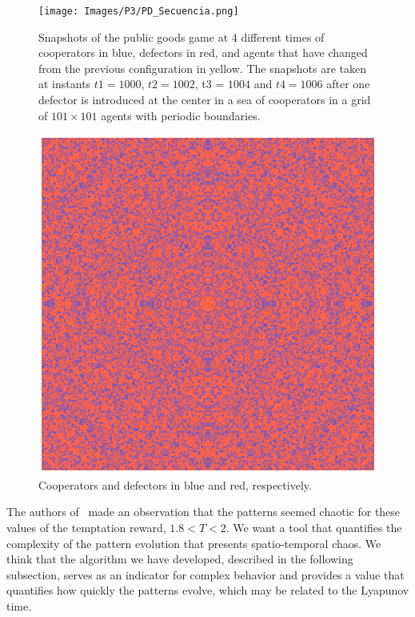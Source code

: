 \begin{figure}
    \centering
    \texttt{[image: Images/P3/PD\_Secuencia.png]}
    \caption{Snapshots of the public goods game at $4$ different times of cooperators in blue, defectors in red, and agents that have changed from the previous configuration in yellow. The snapshots are taken at instants $t1 = 1000$, $t2 = 1002$, t3 = $1004$ and $t4 = 1006$ after one defector is introduced at the center in a sea of cooperators in a grid of $101\times101$ agents with periodic boundaries.}
    \label{fig:PD_Sequencia}
\end{figure}


\begin{figure}
    \centering
    \includegraphics[width=1\linewidth]{Images/P3/PD_GranPlot.eps}
    \caption{Cooperators and defectors in blue and red, respectively.}
    \label{fig:GranPlot}
\end{figure}















The authors of~\cite{SpatialChaos} made an observation that the patterns seemed chaotic for these values of the temptation reward, $1.8 < T < 2$. We want a tool that quantifies the complexity of the pattern evolution that presents spatio-temporal chaos. We think that the algorithm we have developed, described in the following subsection, serves as an indicator for complex behavior and provides a value that quantifies how quickly the patterns evolve, which may be related to the Lyapunov time.




